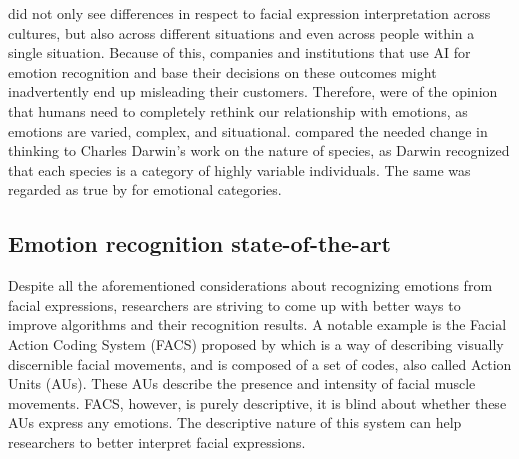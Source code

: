 \newline\newline
\citet{Barrett:2019:EmotionalFromFacialMovements} did not only see differences in respect to facial expression interpretation across cultures, but also across different situations and even across people within a single situation. Because of this, companies and institutions that use AI for emotion recognition and base their decisions on these outcomes might inadvertently end up misleading their customers. Therefore, \citet{Barrett:2019:EmotionalFromFacialMovements} were of the opinion that humans need to completely rethink our relationship with emotions, as emotions are varied, complex, and situational. \citet{Barrett:2019:EmotionalFromFacialMovements} compared the needed change in thinking to Charles Darwin's work on the nature of species, as Darwin recognized that each species is a category of highly variable individuals. The same was regarded as true by \citet{Barrett:2019:EmotionalFromFacialMovements} for emotional categories.
\subsection{Emotion recognition state-of-the-art}
Despite all the aforementioned considerations about recognizing emotions from facial expressions, researchers are striving to come up with better ways to improve algorithms and their recognition results.
\newline\newline
A notable example is the Facial Action Coding System (FACS) proposed by \citet{Ekman:2002:FACS} which is a way of describing visually discernible facial movements, and is composed of a set of codes, also called Action Units (AUs). These AUs describe the presence and intensity of facial muscle movements. FACS, however, is purely descriptive, it is blind about whether these AUs express any emotions. The descriptive nature of this system can help researchers to better interpret facial expressions.

